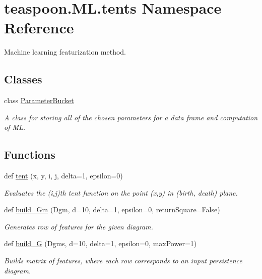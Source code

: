 \hypertarget{namespaceteaspoon_1_1_m_l_1_1tents}{}\section{teaspoon.\+M\+L.\+tents Namespace Reference}
\label{namespaceteaspoon_1_1_m_l_1_1tents}


Machine learning featurization method.  


\subsection*{Classes}
\begin{DoxyCompactItemize}
\item 
class \hyperlink{classteaspoon_1_1_m_l_1_1tents_1_1_parameter_bucket}{Parameter\+Bucket}
\begin{DoxyCompactList}\small\item\em A class for storing all of the chosen parameters for a data frame and computation of ML. \end{DoxyCompactList}\end{DoxyCompactItemize}
\subsection*{Functions}
\begin{DoxyCompactItemize}
\item 
def \hyperlink{namespaceteaspoon_1_1_m_l_1_1tents_a7e54522bba1f674736551ec0522828fa}{tent} (x, y, i, j, delta=1, epsilon=0)
\begin{DoxyCompactList}\small\item\em Evaluates the (i,j)th tent function on the point (x,y) in (birth, death) plane. \end{DoxyCompactList}\item 
def \hyperlink{namespaceteaspoon_1_1_m_l_1_1tents_a2656d1f10bf5c93cc9039a2d524c8bfd}{build\+\_\+\+Gm} (Dgm, d=10, delta=1, epsilon=0, return\+Square=False)
\begin{DoxyCompactList}\small\item\em Generates row of features for the given diagram. \end{DoxyCompactList}\item 
def \hyperlink{namespaceteaspoon_1_1_m_l_1_1tents_a86c1ddf6fc99d9e3ab9cc05909983edb}{build\+\_\+G} (Dgms, d=10, delta=1, epsilon=0, max\+Power=1)
\begin{DoxyCompactList}\small\item\em Builds matrix of features, where each row corresponds to an input persistence diagram. \end{DoxyCompactList}\end{DoxyCompactItemize}


